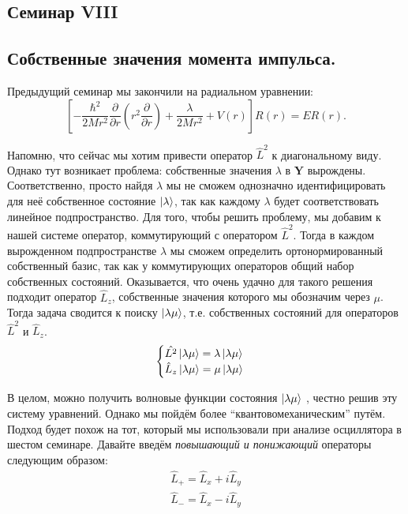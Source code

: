 \begin{center}
    \section{Семинар VIII}
\end{center}
\subsection{Собственные значения момента импульса.}
Предыдущий семинар мы закончили на радиальном уравнении:
\[
\left[-\frac{\hbar^2}{2Mr^2}\frac{\partial}{\partial r}\left( r^2 \frac{\partial}{\partial r}\right)  + \frac{\lambda}{2Mr^2} + V(r)\right]R(r) = ER(r).
\]

Напомню, что сейчас мы хотим привести оператор $\hat{L}^2$ к диагональному виду. Однако тут возникает проблема: собственные значения $\lambda$ в $\mathbf{Y}$ вырождены. Соответственно, просто найдя $\lambda$ мы не сможем однозначно идентифицировать для неё собственное состояние $\ket{\lambda}$, так как каждому $\lambda$ будет соответствовать линейное подпространство. Для того, чтобы решить проблему, мы добавим к нашей системе оператор, коммутирующий с оператором $\hat{L}^2$. Тогда в каждом вырожденном подпространстве $\lambda$ мы сможем определить ортонормированный собственный базис, так как у коммутирующих операторов общий набор собственных состояний. Оказывается, что очень удачно для такого решения подходит оператор $\hat{L}_z$, собственные значения которого мы обозначим через $\mu$. Тогда задача сводится к поиску $\ket{\lambda\mu}$, т.е. собственных состояний для операторов $\hat{L}^2$ и $\hat{L}_z$.
\begin{equation*}
    \begin{cases}
        \hat{L^2}\ket{\lambda\mu} = \lambda\ket{\lambda\mu}\\
        \hat{L}_z\ket{\lambda\mu} = \mu\ket{\lambda\mu}
    \end{cases}
\end{equation*}

В целом, можно получить волновые функции состояния $\ket{\lambda\mu}$ , честно решив эту систему уравнений. Однако мы пойдём более ``квантовомеханическим'' путём. Подход будет похож на тот, который мы использовали при анализе осциллятора в шестом семинаре. Давайте введём \textit{повышающий и понижающий} операторы следующим образом:
\begin{equation*}
    \begin{split}
        \hat{L}_+ = \hat{L}_x + i\hat{L}_y  \\
        \hat{L}_- = \hat{L}_x - i\hat{L}_y 
    \end{split}
\end{equation*}

